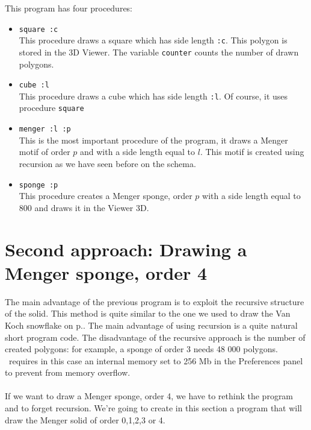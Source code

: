 This program has four procedures:
\begin{itemize}
 \item \texttt{square :c}\\
This procedure draws a square which has side length \texttt{:c}. This polygon is stored in the 3D Viewer. The variable \texttt{counter} counts the number of drawn polygons.
 \item \texttt{cube :l}\\
This procedure draws a cube which has side length \texttt{:l}. Of course, it uses procedure \texttt{square}
 \item \texttt{menger :l :p}\\
This is the most important procedure of the program, it draws a Menger motif of order $p$ and with a side length equal to $l$. This motif is created using recursion as we have seen before on the schema.
 \item \texttt{sponge :p}\\
This procedure creates a Menger sponge, order $p$ with a side length equal to 800 and draws it in the Viewer 3D.
\end{itemize}
\vfill
\pagebreak
\section{Second approach: Drawing a Menger sponge, order 4}
The main advantage of the previous program is to exploit the recursive structure of the solid. This method is quite similar to the one we used to draw the Van Koch snowflake on p.\pageref{vankoch}. The main advantage of using recursion is a quite natural short program code. The disadvantage of the recursive approach is the number of created polygons: for example, a sponge of order 3 needs 48 000 polygons. \xlogo\ requires in this case an internal memory set to 256 Mb in the Preferences panel to prevent from memory overflow. \\ \\
If we want to draw a Menger sponge, order 4, we have to rethink the program and to forget recursion. We're going to create in this section a program that will draw the Menger solid of order 0,1,2,3 or 4.
